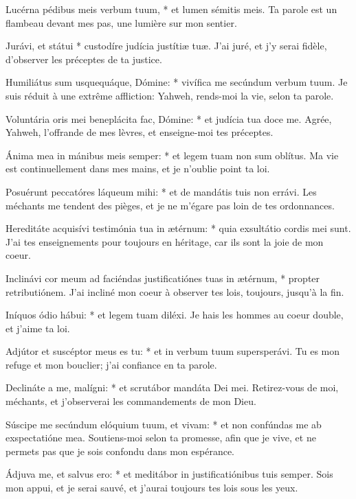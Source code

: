 \begin{paracol}{2}

\LigneParacol
{Lucérna pédibus meis verbum tuum, * et lumen sémitis meis.}
{Ta parole est un flambeau devant mes pas, une lumière sur mon sentier.}

\LigneParacol
{Jurávi, et státui * custodíre judícia justítiæ tuæ.}
{J'ai juré, et j'y serai fidèle, d'observer les préceptes de ta justice.}

\LigneParacol
{Humiliátus sum usquequáque, Dómine: * vivífica me secúndum verbum tuum.}
{Je suis réduit à une extrême affliction: Yahweh, rends-moi la vie, selon ta parole.}

\LigneParacol
{Voluntária oris mei beneplácita fac, Dómine: * et judícia tua doce me.}
{Agrée, Yahweh, l'offrande de mes lèvres, et enseigne-moi tes préceptes.}

\LigneParacol
{Ánima mea in mánibus meis semper: * et legem tuam non sum oblítus.}
{Ma vie est continuellement dans mes mains, et je n'oublie point ta loi.}

\LigneParacol
{Posuérunt peccatóres láqueum mihi: * et de mandátis tuis non errávi.}
{Les méchants me tendent des pièges, et je ne m'égare pas loin de tes ordonnances.}

\LigneParacol
{Hereditáte acquisívi testimónia tua in ætérnum: * quia exsultátio cordis mei sunt.}
{J'ai tes enseignements pour toujours en héritage, car ils sont la joie de mon coeur.}

\LigneParacol
{Inclinávi cor meum ad faciéndas justificatiónes tuas in ætérnum, * propter retributiónem.}
{J'ai incliné mon coeur à observer tes lois, toujours, jusqu'à la fin. }

\LigneParacol
{Iníquos ódio hábui: * et legem tuam diléxi.}
{Je hais les hommes au coeur double, et j'aime ta loi.}

\LigneParacol
{Adjútor et suscéptor meus es tu: * et in verbum tuum supersperávi.}
{Tu es mon refuge et mon bouclier; j'ai confiance en ta parole.}

\LigneParacol
{Declináte a me, malígni: * et scrutábor mandáta Dei mei.}
{Retirez-vous de moi, méchants, et j'observerai les commandements de mon Dieu.}

\LigneParacol
{Súscipe me secúndum elóquium  tuum, et vivam: * et non confúndas me ab exspectatióne mea.}
{Soutiens-moi selon ta promesse, afin que je vive, et ne permets pas que je sois confondu dans mon espérance.}

\LigneParacol
{Ádjuva me, et salvus ero: * et meditábor in justificatiónibus tuis semper.}
{Sois mon appui, et je serai sauvé, et j'aurai toujours tes lois sous les yeux.}


\end{paracol}
